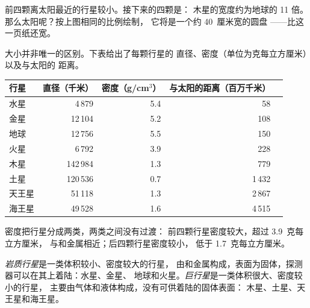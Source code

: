 前四颗离太阳最近的行星较小。接下来的四颗是：
木星的宽度约为地球的 11 倍。那么太阳呢？按上图相同的比例绘制，
它将是一个约 40~厘米宽的圆盘
——比这一页纸还宽。

大小并非唯一的区别。下表给出了每颗行星的
直径、密度（单位为克每立方厘米）以及与太阳的
距离。

\begin{center}
\small
\begin{tabular}{lrrrr}
\hline
行星 & 直径（千米） & 密度（g/cm$^3$） & 与太阳的距离（百万千米）\\
\hline
水星 & 4\,879 & 5.4 & 58\\
金星 & 12\,104 & 5.2 & 108\\
地球 & 12\,756 & 5.5 & 150\\
火星 & 6\,792 & 3.9 & 228\\
\hline
木星 & 142\,984 & 1.3 & 779\\
土星 & 120\,536 & 0.7 & 1\,432\\
天王星 & 51\,118 & 1.3 & 2\,867\\
海王星 & 49\,528 & 1.6 & 4\,515\\
\hline
\end{tabular}
\end{center}

密度把行星分成两类，两类之间没有过渡：
前四颗行星密度较大，超过 3.9~克每立方厘米，
与和金属相近；后四颗行星密度较小，
低于 1.7~克每立方厘米。

\begin{definition}[岩质行星与巨行星]\label{def:g6:earth-a-planet:planet-types}
\emph{岩质行星}是一类体积较小、密度较大的行星，
由和金属构成，表面为固体，探测器可以在其上着陆：水星、金星、
地球和火星。\emph{巨行星}是一类体积很大、密度较小的行星，
主要由气体和液体构成，没有可供着陆的固体表面：
木星、土星、天王星和海王星。
\end{definition}

